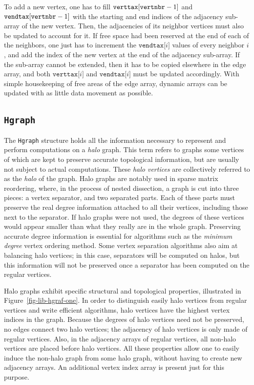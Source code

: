 To add a new vertex, one has to fill $\mathtt{verttax[\lbt vertnbr}
-1\mathtt{]}$ and $\mathtt{vendtax[\lbt vertnbr}\lbt -1\mathtt{]}$
with the starting and end indices of the adjacency sub-array of the
new vertex. Then, the adjacencies of its neighbor vertices must also
be updated to account for it. If free space had been reserved at the
end of each of the neighbors, one just has to increment the
$\mathtt{vendtax[}i\mathtt{]}$ values of every neighbor $i$, and add
the index of the new vertex at the end of the adjacency sub-array. If
the sub-array cannot be extended, then it has to be copied elsewhere
in the edge array, and both $\mathtt{verttax[}i\mathtt{]}$ and
$\mathtt{vendtax[}i\mathtt{]}$ must be updated accordingly. With
simple housekeeping of free areas of the edge array, dynamic arrays
can be updated with as little data movement as possible.

\subsection{\texttt{Hgraph}}
\label{sec-data-hgraph}

The \texttt{Hgraph} structure holds all the information necessary to
represent and perform computations on a \textit{halo} graph. This term
refers to graphs some vertices of which are kept to preserve accurate
topological information, but are usually not subject to actual
computations. These \textit{halo vertices} are collectively referred
to as the \textit{halo} of the graph. Halo graphs are notably used in
sparse matrix reordering, where, in the process of nested dissection,
a graph is cut into three pieces: a vertex separator, and two
separated parts. Each of these parts must preserve the real degree
information attached to all their vertices, including those next to
the separator. If halo graphs were not used, the degrees of these
vertices would appear smaller than what they really are in the whole
graph. Preserving accurate degree information is essential for
algorithms such as the \textit{minimum degree} vertex ordering
method. Some vertex separation algorithms also aim at balancing halo
vertices; in this case, separators will be computed on halos, but this
information will not be preserved once a separator has been computed
on the regular vertices.

Halo graphs exhibit specific structural and topological properties,
illustrated in Figure~\ref{fig-lib-hgraf-one}. In order to distinguish
easily halo vertices from regular vertices and write efficient
algorithms, halo vertices have the highest vertex indices in the
graph. Because the degrees of halo vertices need not be preserved, no
edges connect two halo vertices; the adjacency of halo vertices is
only made of regular vertices. Also, in the adjacency arrays of
regular vertices, all non-halo vertices are placed before halo
vertices. All these properties allow one to easily induce the non-halo
graph from some halo graph, without having to create new adjacency
arrays. An additional vertex index array is present just for this
purpose.

